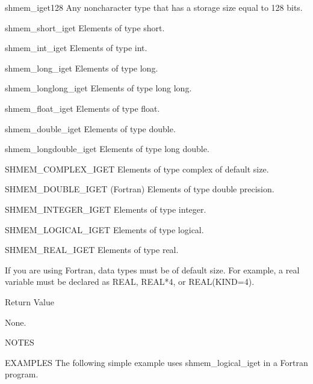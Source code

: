        shmem_iget128		     Any  noncharacter type that has a storage
				     size equal to 128 bits.

       shmem_short_iget		     Elements of type short.

       shmem_int_iget		     Elements of type int.

       shmem_long_iget		     Elements of type long.

       shmem_longlong_iget	     Elements of type long long.

       shmem_float_iget		     Elements of type float.

       shmem_double_iget	     Elements of type double.

       shmem_longdouble_iget	     Elements of type long double.

       SHMEM_COMPLEX_IGET	     Elements of type complex of default size.

       SHMEM_DOUBLE_IGET (Fortran)   Elements of type double precision.

       SHMEM_INTEGER_IGET	     Elements of type integer.

       SHMEM_LOGICAL_IGET	     Elements of type logical.

       SHMEM_REAL_IGET		     Elements of type real.

       If  you	are  using  Fortran,  data types must be of default size.  For
       example,	 a  real  variable  must  be  declared	as  REAL,  REAL*4,  or
       REAL(KIND=4).

Return Value

	None.

NOTES

EXAMPLES
       The  following  simple  example	uses  shmem_logical_iget  in a Fortran
       program.	 

	
